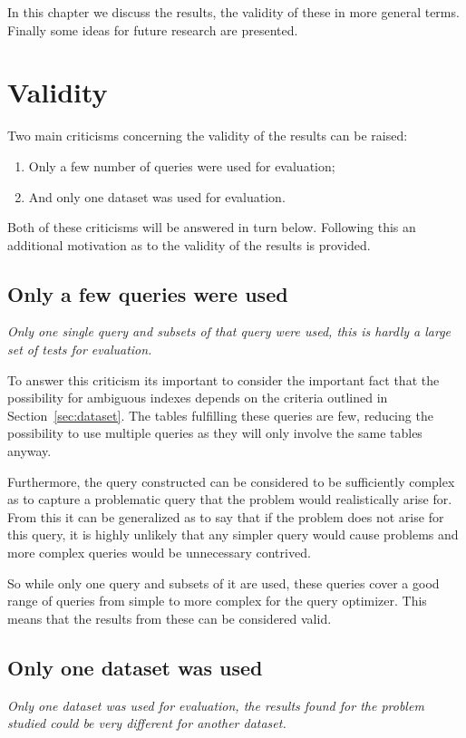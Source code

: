 In this chapter we discuss the results, the validity of these in more general terms. Finally some ideas for future research are presented.

\section{Validity}\label{sec:validity}
Two main criticisms concerning the validity of the results can be raised:
\begin{enumerate}
\item Only a few number of queries were used for evaluation;
\item And only one dataset was used for evaluation.
\end{enumerate}

Both of these criticisms will be answered in turn below. Following this an
additional motivation as to the validity of the results is provided.

\subsection{Only a few queries were used}
\textit{Only one single query and subsets of that query were used, this is hardly a
large set of tests for evaluation.}

To answer this criticism its important to
consider the important fact that the possibility for ambiguous indexes depends
on the criteria outlined in Section~\ref{sec:dataset}. The tables fulfilling
these queries are few, reducing the possibility to use multiple queries as they
will only involve the same tables anyway.

Furthermore, the query constructed can be considered to be sufficiently complex
as to capture a problematic query that the problem would realistically arise
for. From this it can be generalized as to say that if the problem does not
arise for this query, it is highly unlikely that any simpler query would cause
problems and more complex queries would be unnecessary contrived.

So while only one query and subsets of it are used, these queries cover a good
range of queries from simple to more complex for the query optimizer. This means
that the results from these can be considered valid.

\subsection{Only one dataset was used}
\textit{Only one dataset was used for evaluation, the results found for the
  problem studied could be very different for another dataset.}

